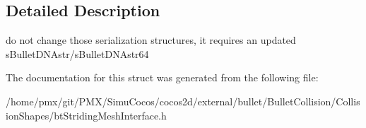 \subsection{Detailed Description}
do not change those serialization structures, it requires an updated s\+Bullet\+D\+N\+Astr/s\+Bullet\+D\+N\+Astr64 

The documentation for this struct was generated from the following file\+:\begin{DoxyCompactItemize}
\item 
/home/pmx/git/\+P\+M\+X/\+Simu\+Cocos/cocos2d/external/bullet/\+Bullet\+Collision/\+Collision\+Shapes/bt\+Striding\+Mesh\+Interface.\+h\end{DoxyCompactItemize}
